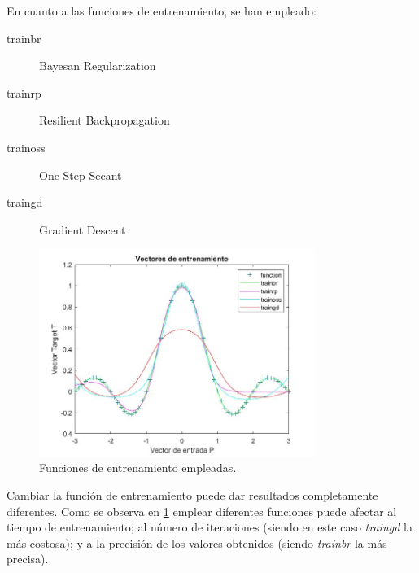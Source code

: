 \documentclass{article}
\begin{document}
En cuanto a las funciones de entrenamiento, se han empleado:

\begin{description}
\item [trainbr] Bayesan Regularization
\item [trainrp] Resilient Backpropagation
\item [trainoss] One Step Secant
\item [traingd] Gradient Descent
\end{description}

\begin{figure}[h]
 \centering
 \includegraphics[width=0.8\textwidth]{../I_ex2/training_functions.jpg}
 \caption{Funciones de entrenamiento empleadas.} 
 \label{tf}
\end{figure}

Cambiar la función de entrenamiento puede dar resultados completamente
diferentes. Como se observa en \hyperref[tf]{\ref{tf}} emplear diferentes
funciones puede afectar al tiempo de entrenamiento; al número de iteraciones
(siendo en este caso \textit{traingd} la más costosa); y a la precisión de los
valores obtenidos (siendo \textit{trainbr} la más precisa).
\end{document}
